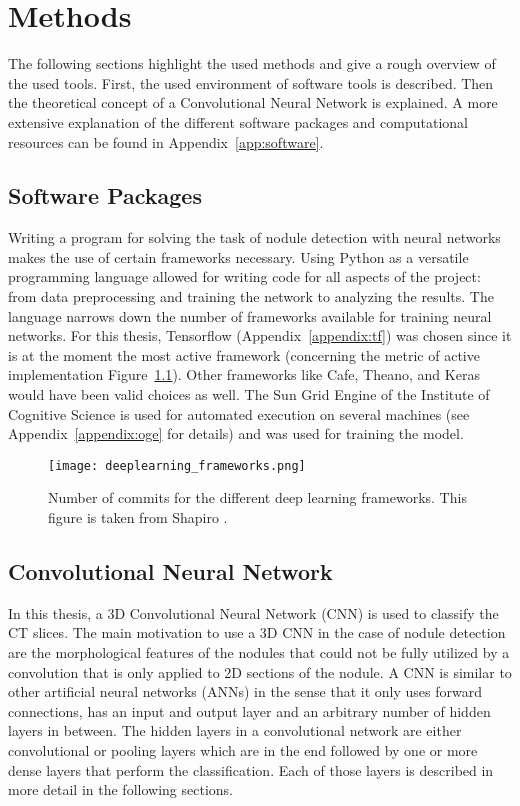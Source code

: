 \documentclass[main.tex]{subfiles}
\begin{document}
\chapter{Methods}\label{chap:methods}
The following sections highlight the used methods and give a rough overview of the used tools. First, the used environment of software tools is described. Then the theoretical concept of a Convolutional Neural Network is explained. A more extensive explanation of the different software packages and computational resources can be found in Appendix~\ref{app:software}.

\section{Software Packages}
Writing a program for solving the task of nodule detection with neural networks makes the use of certain frameworks necessary. Using Python as a versatile programming language allowed for writing code for all aspects of the project: from data preprocessing and training the network to analyzing the results. The language narrows down the number of frameworks available for training neural networks. For this thesis, Tensorflow (Appendix~\ref{appendix:tf}) was chosen since it is at the moment the most active framework (concerning the metric of active implementation Figure~\ref{fig:frameworks}). Other frameworks like Cafe, Theano, and Keras would have been valid choices as well. The Sun Grid Engine of the Institute of Cognitive Science is used for automated execution on several machines (see Appendix~\ref{appendix:oge} for details) and was used for training the model.

\begin{figure}
\begin{center}
\texttt{[image: deeplearning\_frameworks.png]}
\end{center}
\caption{Number of commits for the different deep learning frameworks. This figure is taken from Shapiro \cite{shapiro2017}.}
\label{fig:frameworks}
\end{figure}


\section{Convolutional Neural Network}
In this thesis, a 3D Convolutional Neural Network (CNN) is used to classify the CT slices. The main motivation to use a 3D CNN in the case of nodule detection are the morphological features of the nodules that could not be fully utilized by a convolution that is only applied to 2D sections of the nodule. A CNN is similar to other artificial neural networks (ANNs) in the sense that it only uses forward connections, has an input and output layer and an arbitrary number of hidden layers in between. The hidden layers in a convolutional network are either convolutional or pooling layers which are in the end followed by one or more dense layers that perform the classification. Each of those layers is described in more detail in the following sections.
\end{document}
